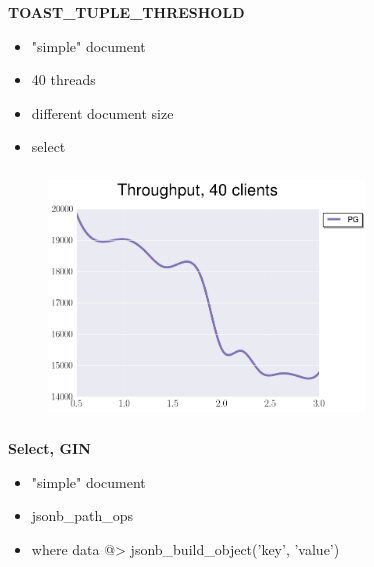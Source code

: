 \documentclass[usenames,dvipsnames, 18pt, compress, aspectratio=169]{beamer}
\begin{document}

\begin{frame}
    \frametitle{}
    \begin{center}
        \textbf{TOAST\_TUPLE\_THRESHOLD}
        \begin{itemize}[label={}]
            \item "simple" document
            \item 40 threads
            \item different document size
            \item select
        \end{itemize}
    \end{center}
\end{frame}

\begin{frame}
    \frametitle{}
    \begin{center}
    \begin{figure}
        \includegraphics[width=0.75\textwidth,center]{benchmarks/workload_c_toast.png}
    \end{figure}

    \end{center}
\end{frame}

\begin{frame}
    \frametitle{}
    \begin{center}
        \textbf{Select, GIN}
        \begin{itemize}[label={}]
            \item "simple" document
            \item jsonb\_path\_ops
            \item where data @> jsonb\_build\_object('key', 'value')
        \end{itemize}
    \end{center}
\end{frame}
\end{document}

